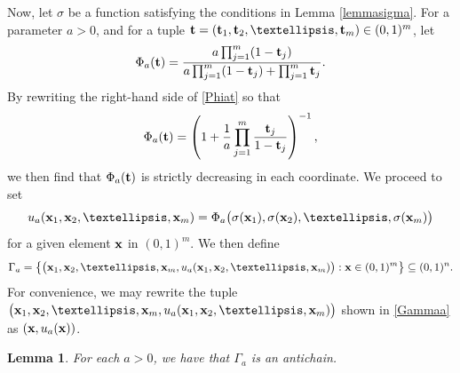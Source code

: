 \documentclass[10pt,a4paper]{amsart}
\newtheorem{lemma}{Lemma}%
\begin{document}
 Now, let $\sigma$ be a function satisfying the conditions in Lemma \ref{lemmasigma}. For a parameter $a > 0$, and for a tuple 
 $ \text{{\bf t}} = (\text{{\bf t}}_1, \text{{\bf t}}_2, \ldots, \text{{\bf t}}_m) \in (0, 1)^{m}$, let 
\begin{equation}\label{Phiat} 
 \Phi_{a}( \text{{\bf t}} ) = 
 \frac{a \prod_{j=1}^{m} (1 - \text{{\bf t}}_j)}{ a \prod_{j=1}^{m} (1 - \text{{\bf t}}_j) + \prod_{j=1}^{m} \text{{\bf t}}_j}.
\end{equation}
 By rewriting the right-hand side of \eqref{Phiat} so that 
 $$ \Phi_{a}(\text{{\bf t}}) = \left( 1 + \frac{1}{a} \prod_{j=1}^{m} \frac{\text{{\bf t}}_j}{1 - \text{{\bf t}}_{j}} \right)^{-1}, $$
 we then find that $\Phi_{a}(\text{{\bf t}})$ is strictly decreasing in each coordinate. 
 We proceed to set 
\begin{equation}\label{defineua}
 u_{a}(\text{{\bf x}}_1, \text{{\bf x}}_2, \ldots, \text{{\bf x}}_{m}) = 
 \Phi_{a}\big( \sigma(\text{{\bf x}}_{1}), \sigma(\text{{\bf x}}_{2}), \ldots, \sigma(\text{{\bf x}}_{m}) \big) 
\end{equation}
 for a given element $\text{{\bf x}}$ in $(0, 1)^{m}$.
 We then define
\begin{equation}\label{Gammaa}
 \Gamma_{a} = \left\{ \big( \text{{\bf x}}_1, \text{{\bf x}}_2, \ldots, \text{{\bf x}}_{m}, 
 u_{a}(\text{{\bf x}}_1, \text{{\bf x}}_2, \ldots, \text{{\bf x}}_{m}) \big) : \text{{\bf x}} \in (0, 1)^{m} \right\} 
 \subseteq (0, 1)^{n}. 
\end{equation}
 For convenience, we may rewrite the tuple $ \big( \text{{\bf x}}_1, \text{{\bf x}}_2, \ldots, \text{{\bf x}}_{m}, 
 u_{a}(\text{{\bf x}}_1, \text{{\bf x}}_2, \ldots, \text{{\bf x}}_{m}) \big) $ shown in 
 \eqref{Gammaa} as $(\text{{\bf x}}, u_{a}(\text{{\bf x}}))$. 

\begin{lemma}\label{oneantichain}%
 For each $a > 0$, we have that $\Gamma_a$ is an antichain. 
\end{lemma}
\end{document}
